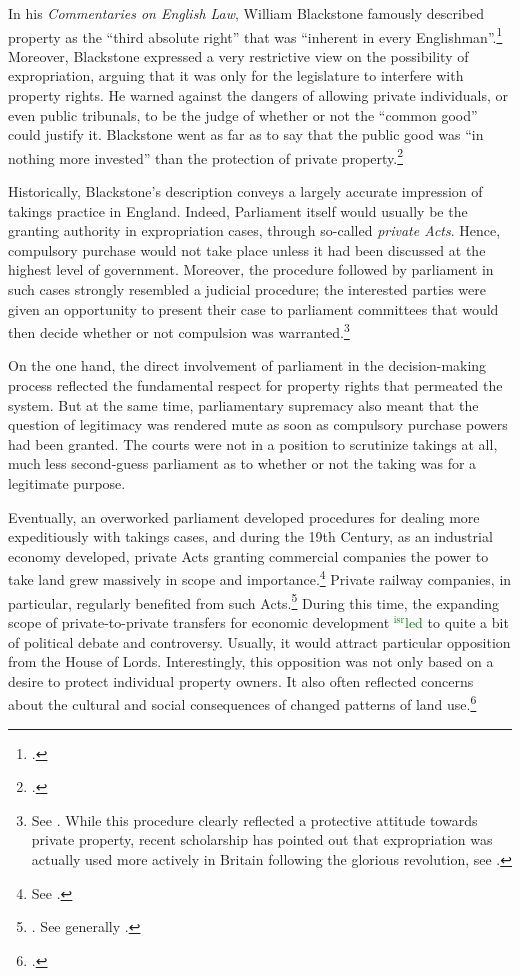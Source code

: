 \documentclass[12pt,a4paper]{book} %
\newcommand{\isr}[1]{\textcolor{green}{$^{\textrm{isr}}${#1}}}
\begin{document}
In his {\it Commentaries on English Law}, William Blackstone famously described property as the ``third absolute right'' that was ``inherent in every Englishman''.\footcite[134-135]{blackstone79}  Moreover, Blackstone expressed a very restrictive view on the possibility of expropriation, arguing that it was only for the legislature to interfere with property rights. He warned against the dangers of allowing private individuals, or even public tribunals, to be the judge of whether or not the ``common good'' could justify it. Blackstone went as far as to say that the public good was ``in nothing more invested'' than the protection of private property.\footcite[134-135]{blackstone79}

Historically, Blackstone's description conveys a largely accurate impression of takings practice in England. Indeed, Parliament itself would usually be the granting authority in expropriation cases, through so-called {\it private Acts}. Hence, compulsory purchase would not take place unless it had been discussed at the highest level of government. Moreover, the procedure followed by parliament in such cases strongly resembled a judicial procedure; the interested parties were given an opportunity to present their case to parliament committees that would then decide whether or not compulsion was warranted.\footnote{See \cite[13-16]{allen00}. While this procedure clearly reflected a protective attitude towards private property, recent scholarship has pointed out that expropriation was actually used more actively in Britain following the glorious revolution, see \cite{hoppit11}.} 

On the one hand, the direct involvement of parliament in the decision-making process reflected the fundamental respect for property rights that permeated the system. But at the same time, parliamentary supremacy also meant that the question of legitimacy was rendered mute as soon as compulsory purchase powers had been granted. The courts were not in a position to scrutinize takings at all, much less second-guess parliament as to whether or not the taking was for a legitimate purpose.

Eventually, an overworked parliament developed procedures for dealing more expeditiously with takings cases, and during the 19th Century, as an industrial economy developed, private Acts granting commercial companies the power to take land grew massively in scope and importance.\footnote{See \cite[204]{allen00}.} Private railway companies, in particular, regularly benefited from such Acts.\footnote{\cite[204]{allen00}. See generally \cite{kostal97}.} During this time, the expanding scope of private-to-private transfers for economic development \isr{led} to quite a bit of political debate and controversy. Usually, it would attract particular opposition from the House of Lords. Interestingly, this opposition was not only based on a desire to protect individual property owners. It also often reflected concerns about the cultural and social consequences of changed patterns of land use.\footcite[204]{allen00} 
\end{document}
